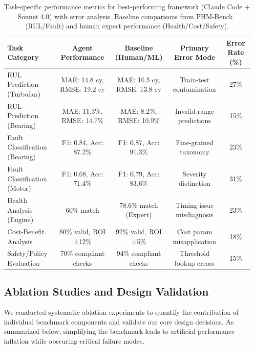 \documentclass[sigconf, screen, nonacm]{acmart}
\begin{document}
\begin{table}[t]        
\caption{Task-specific performance metrics for best-performing framework 
(Claude Code + Sonnet 4.0) with error analysis. Baseline comparisons from PHM-Bench~\cite{yang2025phmbenchdomainspecificbenchmarkingframework} (RUL/Fault) and human expert performance (Health/Cost/Safety).}
\label{tab:task_metrics}                  
\centering          
\small                               
\begin{tabular}{@{}lcccc@{}}                         
\toprule
\textbf{Task Category} & \textbf{Agent Performance} & \textbf{Baseline (Human/ML)} & \textbf{Primary Error Mode} & \textbf{Error Rate (\%)} \\      
\midrule                    
RUL Prediction (Turbofan) & MAE: 14.8 cy, RMSE: 19.2 cy & MAE: 10.5 cy, RMSE: 13.8 cy & Train-test contamination & 27\% \\                         
\midrule
RUL Prediction (Bearing) & MAE: 11.3\%, RMSE: 14.7\% & MAE: 8.2\%, RMSE: 10.9\% & Invalid range predictions & 15\% \\                               
\midrule                    
Fault Classification (Bearing) & F1: 0.84, Acc: 87.2\% & F1: 0.87, Acc: 91.3\% & Fine-grained taxonomy & 23\% \\                                   
\midrule                    
Fault Classification (Motor) & F1: 0.68, Acc: 71.4\% & F1: 0.79, Acc: 83.6\% & Severity distinction & 31\% \\                                    
\midrule                    
Health Analysis (Engine) & 60\% match & 78.6\% match (Expert) & Timing issue misdiagnosis & 23\% \\ \midrule                    
Cost-Benefit Analysis & 80\% valid, ROI ±12\% & 92\% valid, ROI ±5\% &   
Cost param misapplication & 18\% \\
\midrule          
Safety/Policy Evaluation & 70\% compliant checks & 94\% compliant checks & Threshold lookup errors & 15\% \\                           
    \bottomrule                                 
    \end{tabular}                                                
  \end{table}        
\subsection{Ablation Studies and Design Validation}
We conducted systematic ablation experiments to quantify the contribution of individual benchmark components and validate our core design decisions. As summarized below, simplifying the benchmark leads to artificial performance inflation while obscuring critical failure modes.
\end{document}
